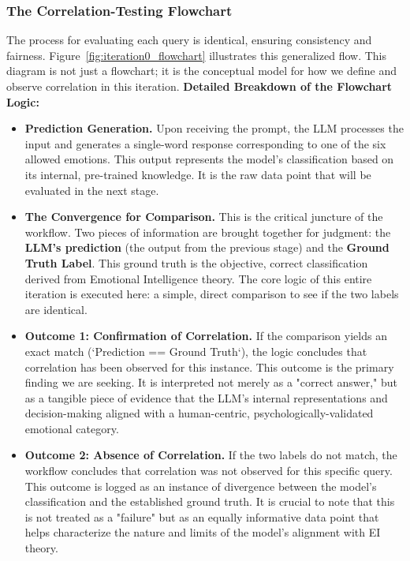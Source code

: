 \subsubsection{The Correlation-Testing Flowchart}
The process for evaluating each query is identical, ensuring consistency and fairness. Figure~\ref{fig:iteration0_flowchart} illustrates this generalized flow. This diagram is not just a flowchart; it is the conceptual model for how we define and observe correlation in this iteration.
\textbf{Detailed Breakdown of the Flowchart Logic:}
\begin{itemize}
\item \textbf{Prediction Generation.} Upon receiving the prompt, the LLM processes the input and generates a single-word response corresponding to one of the six allowed emotions. This output represents the model's classification based on its internal, pre-trained knowledge. It is the raw data point that will be evaluated in the next stage.

\item \textbf{The Convergence for Comparison.} This is the critical juncture of the workflow. Two pieces of information are brought together for judgment: the \textbf{LLM's prediction} (the output from the previous stage) and the \textbf{Ground Truth Label}. This ground truth is the objective, correct classification derived from Emotional Intelligence theory. The core logic of this entire iteration is executed here: a simple, direct comparison to see if the two labels are identical.

\item \textbf{Outcome 1: Confirmation of Correlation.} If the comparison yields an exact match (`Prediction == Ground Truth`), the logic concludes that correlation has been observed for this instance. This outcome is the primary finding we are seeking. It is interpreted not merely as a "correct answer," but as a tangible piece of evidence that the LLM's internal representations and decision-making aligned with a human-centric, psychologically-validated emotional category.

\item \textbf{Outcome 2: Absence of Correlation.} If the two labels do not match, the workflow concludes that correlation was not observed for this specific query. This outcome is logged as an instance of divergence between the model's classification and the established ground truth. It is crucial to note that this is not treated as a "failure" but as an equally informative data point that helps characterize the nature and limits of the model's alignment with EI theory.
\end{itemize}

